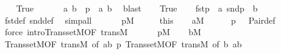 \begin{isabellebody}
\isanewline
\ \ \isamarkupfalse%
\ True\isanewline
\ \ \isamarkupfalse%
\isanewline
\ \ \isamarkupfalse%
\ a\ b\ \ {\isachardoublequoteopen}p\ {\isacharequal}{\kern0pt}\ {\isasymlangle}a{\isacharcomma}{\kern0pt}\ b{\isasymrangle}{\isachardoublequoteclose}\ \isamarkupfalse%
\ blast\isanewline
\ \ \isamarkupfalse%
\ True\isanewline
\ \ \isamarkupfalse%
\ {\isachardoublequoteopen}fst{\isacharparenleft}{\kern0pt}p{\isacharparenright}{\kern0pt}\ {\isacharequal}{\kern0pt}\ a{\isachardoublequoteclose}\ {\isachardoublequoteopen}snd{\isacharparenleft}{\kern0pt}p{\isacharparenright}{\kern0pt}\ {\isacharequal}{\kern0pt}\ b{\isachardoublequoteclose}\ \isamarkupfalse%
\ fst{\isacharunderscore}{\kern0pt}def\ snd{\isacharunderscore}{\kern0pt}def\ \isamarkupfalse%
\ simp{\isacharunderscore}{\kern0pt}all\isanewline
\ \ \isamarkupfalse%
\isanewline
\ \ \isamarkupfalse%
\ {\isachardoublequoteopen}p{\isasymin}M{\isachardoublequoteclose}\isanewline
\ \ \isamarkupfalse%
\ \isamarkupfalse%
\ this\isanewline
\ \ \isamarkupfalse%
\ {\isachardoublequoteopen}a{\isasymin}M{\isachardoublequoteclose}\isanewline
\ \ \ \ \isamarkupfalse%
\ {\isacartoucheopen}p\ {\isacharequal}{\kern0pt}\ {\isacharunderscore}{\kern0pt}{\isacartoucheclose}\ Pair{\isacharunderscore}{\kern0pt}def\ \isamarkupfalse%
\ {\isacharparenleft}{\kern0pt}force\ intro{\isacharcolon}{\kern0pt}Transset{\isacharunderscore}{\kern0pt}M{\isacharbrackleft}{\kern0pt}OF\ trans{\isacharunderscore}{\kern0pt}M{\isacharbrackright}{\kern0pt}{\isacharparenright}{\kern0pt}\isanewline
\ \ \isamarkupfalse%
\ \isamarkupfalse%
\ \ {\isacartoucheopen}p{\isasymin}M{\isacartoucheclose}\isanewline
\ \ \isamarkupfalse%
\ {\isachardoublequoteopen}b{\isasymin}M{\isachardoublequoteclose}\isanewline
\ \ \ \ \isamarkupfalse%
\ Transset{\isacharunderscore}{\kern0pt}M{\isacharbrackleft}{\kern0pt}OF\ trans{\isacharunderscore}{\kern0pt}M{\isacharcomma}{\kern0pt}\ of\ {\isachardoublequoteopen}{\isacharbraceleft}{\kern0pt}a{\isacharcomma}{\kern0pt}b{\isacharbraceright}{\kern0pt}{\isachardoublequoteclose}\ p{\isacharbrackright}{\kern0pt}\ Transset{\isacharunderscore}{\kern0pt}M{\isacharbrackleft}{\kern0pt}OF\ trans{\isacharunderscore}{\kern0pt}M{\isacharcomma}{\kern0pt}\ of\ {\isachardoublequoteopen}b{\isachardoublequoteclose}\ {\isachardoublequoteopen}{\isacharbraceleft}{\kern0pt}a{\isacharcomma}{\kern0pt}b{\isacharbraceright}{\kern0pt}{\isachardoublequoteclose}{\isacharbrackright}{\kern0pt}\isanewline

\end{isabellebody}
